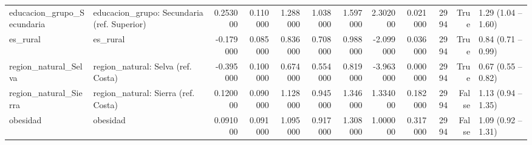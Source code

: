 \begin{table}[htbp]
\begin{tabular}{llrrrrrrrrrl}
educacion\_grupo\_Secundaria & educacion\_grupo: Secundaria (ref. Superior) & 0.253000 & 0.110000 & 1.288000 & 1.038000 & 1.597000 & 2.302000 & 0.021000 & 2994 & True & 1.29 (1.04 – 1.60) \\
es\_rural & es\_rural & -0.179000 & 0.085000 & 0.836000 & 0.708000 & 0.988000 & -2.099000 & 0.036000 & 2994 & True & 0.84 (0.71 – 0.99) \\
region\_natural\_Selva & region\_natural: Selva (ref. Costa) & -0.395000 & 0.100000 & 0.674000 & 0.554000 & 0.819000 & -3.963000 & 0.000000 & 2994 & True & 0.67 (0.55 – 0.82) \\
region\_natural\_Sierra & region\_natural: Sierra (ref. Costa) & 0.120000 & 0.090000 & 1.128000 & 0.945000 & 1.346000 & 1.334000 & 0.182000 & 2994 & False & 1.13 (0.94 – 1.35) \\
obesidad & obesidad & 0.091000 & 0.091000 & 1.095000 & 0.917000 & 1.308000 & 1.000000 & 0.317000 & 2994 & False & 1.09 (0.92 – 1.31) \\
\bottomrule
\end{tabular}
\end{table}
